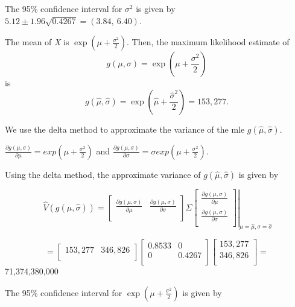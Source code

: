 \documentclass[]{book}
\begin{document}
The 95\% confidence interval for \(\sigma^{2}\) is given by
\(5.12 \pm 1.96\sqrt{0.4267} = \left( 3.84,\ 6.40 \right)\).

The mean of \emph{X} is
\(\exp\left( \mu + \frac{\sigma^{2}}{2} \right)\). Then, the maximum
likelihood estimate of
\[g\left( \mu,\sigma \right) = \exp\left( \mu + \frac{\sigma^{2}}{2} \right)\]
is
\[g\left( \hat{\mu},\hat{\sigma} \right) = \exp\left( \hat{\mu} + \frac{{\hat{\sigma}}^{2}}{2} \right) = 153,277.\]

We use the delta method to approximate the variance of the mle
\(g\left( \hat{\mu},\hat{\sigma} \right)\).

\(\frac{\partial g\left( \mu,\sigma \right)}{\partial\mu} = exp\left( \mu + \frac{\sigma^{2}}{2} \right)\)
and
\(\frac{\partial g\left( \mu,\sigma \right)}{\partial\sigma} = \sigma exp\left( \mu + \frac{\sigma^{2}}{2} \right)\).

Using the delta method, the approximate variance of
\(g\left( \hat{\mu},\hat{\sigma} \right)\) is given by

\[\left. \ \hat{V}\left( g\left( \hat{\mu},\hat{\sigma} \right) \right) = \begin{bmatrix}
\frac{\partial g\left( \mu,\sigma \right)}{\partial\mu} & \frac{\partial g\left( \mu,\sigma \right)}{\partial\sigma} \\
\end{bmatrix}\Sigma\begin{bmatrix}
\frac{\partial g\left( \mu,\sigma \right)}{\partial\mu} \\
\frac{\partial g\left( \mu,\sigma \right)}{\partial\sigma} \\
\end{bmatrix} \right|_{\mu = \hat{\mu},\sigma = \hat{\sigma}}\]

\[= \begin{bmatrix}
153,277 & 346,826 \\
\end{bmatrix}\begin{bmatrix}
0.8533 & 0 \\
0 & 0.4267 \\
\end{bmatrix}\begin{bmatrix}
153,277 \\
346,826 \\
\end{bmatrix} =\]71,374,380,000

The 95\% confidence interval for
\(\exp\left( \mu + \frac{\sigma^{2}}{2} \right)\) is given by
\end{document}
